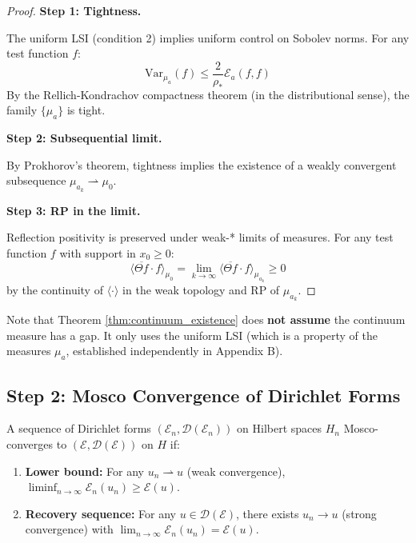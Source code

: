 \begin{proof}
\textbf{Step 1: Tightness.}

The uniform LSI (condition 2) implies uniform control on Sobolev norms. For any test function $f$:
\begin{equation}
    \text{Var}_{\mu_a}(f) \leq \frac{2}{\rho_*} \mathcal{E}_a(f, f)
\end{equation}
By the Rellich-Kondrachov compactness theorem (in the distributional sense), the family $\{\mu_a\}$ is tight.

\textbf{Step 2: Subsequential limit.}

By Prokhorov's theorem, tightness implies the existence of a weakly convergent subsequence $\mu_{a_k} \rightharpoonup \mu_0$.

\textbf{Step 3: RP in the limit.}

Reflection positivity is preserved under weak-* limits of measures. For any test function $f$ with support in $x_0 \geq 0$:
\begin{equation}
    \langle \overline{\Theta f} \cdot f \rangle_{\mu_0} = \lim_{k \to \infty} \langle \overline{\Theta f} \cdot f \rangle_{\mu_{a_k}} \geq 0
\end{equation}
by the continuity of $\langle \cdot \rangle$ in the weak topology and RP of $\mu_{a_k}$.
\end{proof}

\begin{remark}
Note that Theorem \ref{thm:continuum_existence} does \textbf{not assume} the continuum measure has a gap. It only uses the uniform LSI (which is a property of the measures $\mu_a$, established independently in Appendix B).
\end{remark}

\subsection{Step 2: Mosco Convergence of Dirichlet Forms}

\begin{definition}
A sequence of Dirichlet forms $(\mathcal{E}_n, \mathcal{D}(\mathcal{E}_n))$ on Hilbert spaces $H_n$ Mosco-converges to $(\mathcal{E}, \mathcal{D}(\mathcal{E}))$ on $H$ if:
\begin{enumerate}
    \item \textbf{Lower bound:} For any $u_n \rightharpoonup u$ (weak convergence), $\liminf_{n \to \infty} \mathcal{E}_n(u_n) \geq \mathcal{E}(u)$.
    \item \textbf{Recovery sequence:} For any $u \in \mathcal{D}(\mathcal{E})$, there exists $u_n \to u$ (strong convergence) with $\lim_{n \to \infty} \mathcal{E}_n(u_n) = \mathcal{E}(u)$.
\end{enumerate}
\end{definition}

